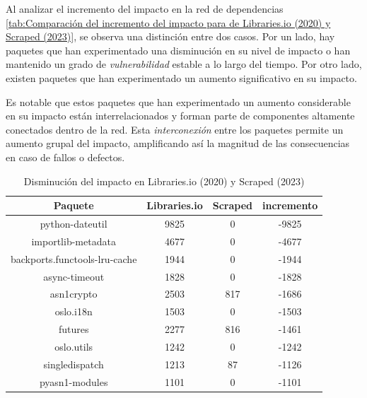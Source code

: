 Al analizar el incremento del impacto en la red de dependencias \ref{tab:Comparación del incremento del impacto para de Libraries.io (2020) y Scraped (2023)}, se observa una distinción entre
dos casos. Por un lado, hay paquetes que han experimentado una disminución en su nivel de impacto
o han mantenido un grado de \emph{vulnerabilidad} estable a lo largo del tiempo. Por otro lado,
existen paquetes que han experimentado un aumento significativo en su impacto.

Es notable que estos paquetes que han experimentado un aumento considerable en su impacto
están interrelacionados y forman parte de componentes altamente conectados dentro de la red.
Esta \emph{interconexión} entre los paquetes permite un aumento grupal del impacto, amplificando
así la magnitud de las consecuencias en caso de fallos o defectos.


\begin{table}[ht!]
    \centering
    \label{tab:Disminución del impacto en Libraries.io y Scraped}
    \begin{tabular}{|c|c|c|c|}
        \hline
        \textbf{Paquete}              & \textbf{Libraries.io} & \textbf{Scraped} & \textbf{incremento} \\
        \hline
        python-dateutil               & 9825                 & 0                & -9825               \\
        importlib-metadata            & 4677                 & 0                & -4677               \\
        backports.functools-lru-cache & 1944                 & 0                & -1944               \\
        async-timeout                 & 1828                 & 0                & -1828               \\
        asn1crypto                    & 2503                 & 817              & -1686               \\
        oslo.i18n                     & 1503                 & 0                & -1503               \\
        futures                       & 2277                 & 816              & -1461               \\
        oslo.utils                    & 1242                 & 0                & -1242               \\
        singledispatch                & 1213                 & 87               & -1126               \\
        pyasn1-modules                & 1101                 & 0                & -1101               \\
        \hline
    \end{tabular}
    \caption{Disminución del impacto en Libraries.io (2020) y Scraped (2023)}
\end{table}

